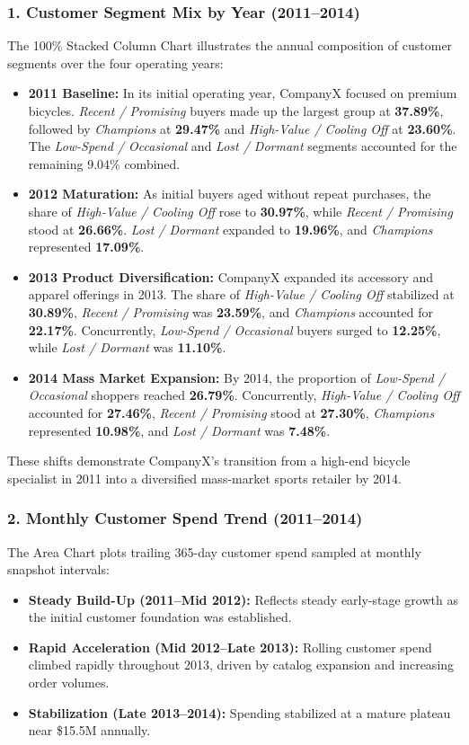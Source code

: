 \subsubsection{1. Customer Segment Mix by Year (2011--2014)}
The 100\% Stacked Column Chart illustrates the annual composition of customer segments over the four operating years:
\begin{itemize}
    \item \textbf{2011 Baseline:} In its initial operating year, CompanyX focused on premium bicycles. \textit{Recent / Promising} buyers made up the largest group at \textbf{37.89\%}, followed by \textit{Champions} at \textbf{29.47\%} and \textit{High-Value / Cooling Off} at \textbf{23.60\%}. The \textit{Low-Spend / Occasional} and \textit{Lost / Dormant} segments accounted for the remaining 9.04\% combined.
    \item \textbf{2012 Maturation:} As initial buyers aged without repeat purchases, the share of \textit{High-Value / Cooling Off} rose to \textbf{30.97\%}, while \textit{Recent / Promising} stood at \textbf{26.66\%}. \textit{Lost / Dormant} expanded to \textbf{19.96\%}, and \textit{Champions} represented \textbf{17.09\%}.
    \item \textbf{2013 Product Diversification:} CompanyX expanded its accessory and apparel offerings in 2013. The share of \textit{High-Value / Cooling Off} stabilized at \textbf{30.89\%}, \textit{Recent / Promising} was \textbf{23.59\%}, and \textit{Champions} accounted for \textbf{22.17\%}. Concurrently, \textit{Low-Spend / Occasional} buyers surged to \textbf{12.25\%}, while \textit{Lost / Dormant} was \textbf{11.10\%}.
    \item \textbf{2014 Mass Market Expansion:} By 2014, the proportion of \textit{Low-Spend / Occasional} shoppers reached \textbf{26.79\%}. Concurrently, \textit{High-Value / Cooling Off} accounted for \textbf{27.46\%}, \textit{Recent / Promising} stood at \textbf{27.30\%}, \textit{Champions} represented \textbf{10.98\%}, and \textit{Lost / Dormant} was \textbf{7.48\%}.
\end{itemize}
These shifts demonstrate CompanyX's transition from a high-end bicycle specialist in 2011 into a diversified mass-market sports retailer by 2014.

\subsubsection{2. Monthly Customer Spend Trend (2011--2014)}
The Area Chart plots trailing 365-day customer spend sampled at monthly snapshot intervals:
\begin{itemize}
    \item \textbf{Steady Build-Up (2011--Mid 2012):} Reflects steady early-stage growth as the initial customer foundation was established.
    \item \textbf{Rapid Acceleration (Mid 2012--Late 2013):} Rolling customer spend climbed rapidly throughout 2013, driven by catalog expansion and increasing order volumes.
    \item \textbf{Stabilization (Late 2013--2014):} Spending stabilized at a mature plateau near \$15.5M annually.
\end{itemize}


